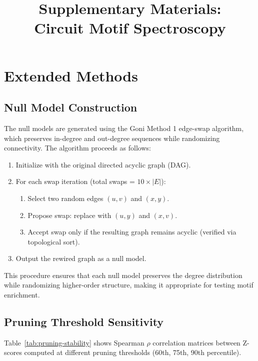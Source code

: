 \documentclass[11pt,a4paper]{article}
\title{Supplementary Materials:\\Circuit Motif Spectroscopy}
\author{}
\date{}
\begin{document}
\maketitle
\tableofcontents
\clearpage


\section{Extended Methods}

\subsection{Null Model Construction}
The null models are generated using the Goni Method 1 edge-swap algorithm,
which preserves in-degree and out-degree sequences while randomizing connectivity.
The algorithm proceeds as follows:

\begin{enumerate}
\item Initialize with the original directed acyclic graph (DAG).
\item For each swap iteration (total swaps = $10 \times |E|$):
  \begin{enumerate}
  \item Select two random edges $(u,v)$ and $(x,y)$.
  \item Propose swap: replace with $(u,y)$ and $(x,v)$.
  \item Accept swap only if the resulting graph remains acyclic (verified via topological sort).
  \end{enumerate}
\item Output the rewired graph as a null model.
\end{enumerate}

This procedure ensures that each null model preserves the degree distribution while
randomizing higher-order structure, making it appropriate for testing motif enrichment.

\subsection{Pruning Threshold Sensitivity}
Table~\ref{tab:pruning-stability} shows Spearman $\rho$ correlation matrices between Z-scores computed at different pruning thresholds (60th, 75th, 90th percentile).
\end{document}

